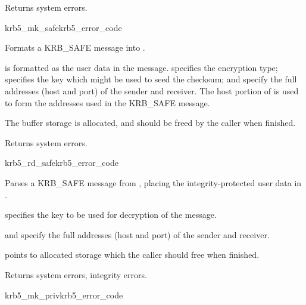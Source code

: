 Returns system errors.

\begin{funcdecl}{krb5_mk_safe}{krb5_error_code}{\funcin}
\funcout
{}
\end{funcdecl}

Formats a KRB_SAFE message into .

 is formatted as the user data in the message.
 specifies the encryption type; 
specifies the key which might be used to seed the checksum;
 and  specify the full
addresses (host and port) of the sender and receiver.  The host portion
of  is used to form the addresses used in the
KRB_SAFE message.

The  buffer storage is allocated, and should be freed by the
caller when finished.

Returns system errors.

\begin{funcdecl}{krb5_rd_safe}{krb5_error_code}{\funcin}
\funcout
{}
\end{funcdecl}

Parses a KRB_SAFE message from , placing the
integrity-protected user data in .

 specifies the key to be used for decryption of the message.
 
 and  specify the full
addresses (host and port) of the sender and receiver.

 points to allocated storage which the caller should
free when finished.

Returns system errors, integrity errors.

\begin{funcdecl}{krb5_mk_priv}{krb5_error_code}{\funcin}
\funcinout
{}
\funcout
{}
\end{funcdecl}

